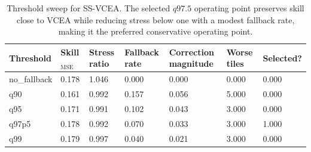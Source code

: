 \begin{table}[t]
\centering
\footnotesize
\begin{tabular}{lllllll}
\toprule
Threshold & Skill$_{\mathrm{MSE}}$ & Stress ratio & Fallback rate & Correction magnitude & Worse tiles & Selected? \\
\midrule
no\_fallback & 0.178 & 1.046 & 0.000 & 0.000 & 0.000 & 0.000 \\
q90 & 0.161 & 0.992 & 0.157 & 0.056 & 5.000 & 0.000 \\
q95 & 0.171 & 0.991 & 0.102 & 0.043 & 3.000 & 0.000 \\
q97p5 & 0.178 & 0.992 & 0.070 & 0.033 & 3.000 & 1.000 \\
q99 & 0.179 & 0.997 & 0.040 & 0.021 & 3.000 & 0.000 \\
\bottomrule
\end{tabular}
\caption{Threshold sweep for SS-VCEA. The selected $q97.5$ operating point preserves skill close to VCEA while reducing stress below one with a modest fallback rate, making it the preferred conservative operating point.}
\label{tab:e6_threshold_sweep}
\end{table}
